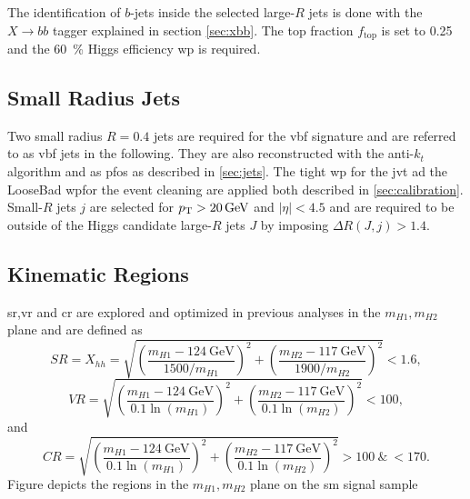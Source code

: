 
The identification of $b$-jets inside the selected large-$R$ jets is done with the $X\rightarrow bb$ tagger explained in section \ref{sec:xbb}. The top fraction $f_\text{top}$ is set to 0.25 and the \qty[]{60}{\percent} Higgs efficiency \ac{wp} is required.

\subsection{Small Radius Jets}
Two small radius $R=0.4$ jets are required for the \ac{vbf} signature and are referred to as \ac{vbf} jets in the following. They are also reconstructed with the anti-$k_t$ algorithm and as \acp{pfo} as described in \ref{sec:jets}. The tight \ac{wp} for the \ac{jvt} ad the LooseBad \ac{wp}for the event cleaning are applied both described in \ref{sec:calibration}. Small-$R$ jets $j$ are selected for $p_{\text{T}}>\qty[]{20}{GeV}$ and $|\eta|<4.5$ and are required to be outside of the Higgs candidate large-$R$ jets $J$ by imposing $\Delta R(J,j) > 1.4$. 

\subsection{Kinematic Regions}\label{sec:kinematic_regions}
\ac{sr},\ac{vr} and \ac{cr} are explored and optimized in previous analyses \citep{aad2023search,ATL-COM-PHYS-2023-033} in the $m_{H1},m_{H2}$ plane and are defined as
\begin{equation}
    SR=X_{hh} =  \sqrt{\left(\frac{m_{H1} - \SI{124}{\GeV}}{1500 / m_{H1}}\right)^{2} + \left(\frac{m_{H2} - \SI{117}{\GeV}}{1900 / m_{H2}}\right)^{2}} < 1.6,
\end{equation}
\begin{equation}
    \label{VR_Xhh}
    VR =  \sqrt{\left(\frac{m_{H1} - \SI{124}{\GeV}}{0.1 \ln(m_{H1})}\right)^{2} + \left(\frac{m_{H2} - \SI{117}{\GeV}}{0.1 \ln(m_{H2})}\right)^{2}} < 100,
\end{equation}
and
\begin{equation}
    \label{CR_Xhh}
    CR = \sqrt{\left(\frac{m_{H1} - \SI{124}{\GeV}}{0.1 \ln(m_{H1})}\right)^{2} + \left(\frac{m_{H2} - \SI{117}{\GeV}}{0.1 \ln(m_{H2})}\right)^{2}} > 100  \ \& \ < 170.
\end{equation}
Figure depicts the regions in the $m_{H1},m_{H2}$ plane on the \ac{sm} signal sample

